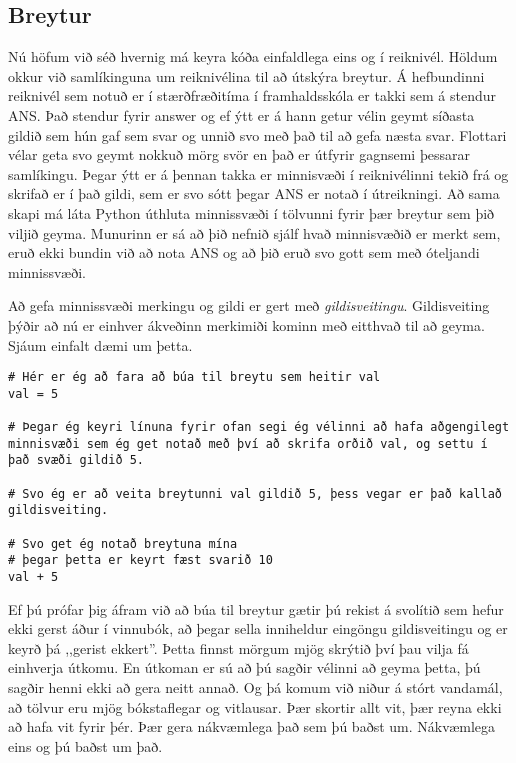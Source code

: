 \documentclass[11pt,fleqn]{book} %
\begin{document}
\subsection{Breytur}
Nú höfum við séð hvernig má keyra kóða einfaldlega eins og í reiknivél.
Höldum okkur við samlíkinguna um reiknivélina til að útskýra breytur.
Á hefbundinni reiknivél sem notuð er í stærðfræðitíma í framhaldsskóla er takki sem á stendur ANS.
Það stendur fyrir answer og ef ýtt er á hann getur vélin geymt síðasta gildið sem hún gaf sem svar og unnið svo með það til að gefa næsta svar.
Flottari vélar geta svo geymt nokkuð mörg svör en það er útfyrir gagnsemi þessarar samlíkingu.
Þegar ýtt er á þennan takka er minnisvæði í reiknivélinni tekið frá og skrifað er í það gildi, sem er svo sótt þegar ANS er notað í útreikningi.
Að sama skapi má láta Python úthluta minnissvæði í tölvunni fyrir þær breytur sem þið viljið geyma.
Munurinn er sá að þið nefnið sjálf hvað minnisvæðið er merkt sem, eruð ekki bundin við að nota ANS og að þið eruð svo gott sem með óteljandi minnissvæði.

Að gefa minnissvæði merkingu og gildi er gert með \textit{gildisveitingu}.
Gildisveiting þýðir að nú er einhver ákveðinn merkimiði kominn með eitthvað til að geyma.
Sjáum einfalt dæmi um þetta.

\begin{lstlisting}[caption=Breytur kynntar]
# Hér er ég að fara að búa til breytu sem heitir val
val = 5

# Þegar ég keyri línuna fyrir ofan segi ég vélinni að hafa aðgengilegt minnisvæði sem ég get notað með því að skrifa orðið val, og settu í það svæði gildið 5.

# Svo ég er að veita breytunni val gildið 5, þess vegar er það kallað gildisveiting.

# Svo get ég notað breytuna mína
# þegar þetta er keyrt fæst svarið 10
val + 5
\end{lstlisting}

Ef þú prófar þig áfram við að búa til breytur gætir þú rekist á svolítið sem hefur ekki gerst áður í vinnubók, að þegar sella inniheldur eingöngu gildisveitingu og er keyrð þá ,,gerist ekkert''.
Þetta finnst mörgum mjög skrýtið því þau vilja fá einhverja útkomu.
En útkoman er sú að þú sagðir vélinni að geyma þetta, þú sagðir henni ekki að gera neitt annað.
Og þá komum við niður á stórt vandamál, að tölvur eru mjög bókstaflegar og vitlausar.
Þær skortir allt vit, þær reyna ekki að hafa vit fyrir þér. 
Þær gera nákvæmlega það sem þú baðst um.
Nákvæmlega eins og þú baðst um það.
\end{document}
